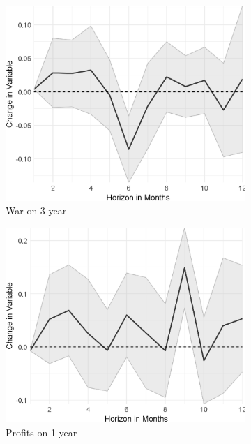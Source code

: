 \begin{figure}[H]
\begin{subfigure}{00.32\textwidth}
	\includegraphics[width=1\textwidth]{output/lp/baseline/diff/war/waronexpectations3y_djn.eps}
	\caption{War on 3-year}
\end{subfigure}
\begin{subfigure}{00.32\textwidth}
	\includegraphics[width=1\textwidth]{output/lp/baseline/diff/profits/profitsonexpectations1y_djn.eps}
	\caption{Profits on 1-year}
\end{subfigure}
\begin{subfigure}{00.32\textwidth}

\end{subfigure}
\end{figure}
